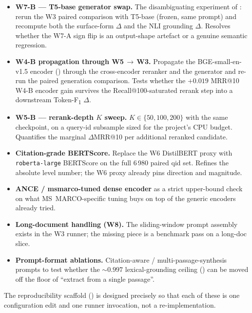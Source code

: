\documentclass[11pt,a4paper]{article}
\makeatletter
\newcommand{\fdev}{6\,980}
\newcommand{\msmarco}{MS~MARCO}
\newcommand{\F}{F\textsubscript{1}}
\newcommand{\Tokenf}{Token-\F}
\newcommand{\bertscore}{BERTScore}
\newcommand{\mrr}{MRR@10}
\newcommand{\recallH}{Recall@100}
\newcommand{\barrow}{\,\allowbreak\ensuremath{\rightarrow}\allowbreak\,}
\makeatother
\begin{document}
\begin{itemize}
  \item \textbf{W7-B --- T5-base generator swap.}  The disambiguating
        experiment of : rerun the W3
        paired comparison with T5-base (frozen, same prompt) and
        recompute both the surface-form $\Delta$ and the NLI
        grounding $\Delta$.  Resolves whether the W7-A sign flip
        is an output-shape artefact or a genuine semantic
        regression.
  \item \textbf{W4-B propagation through W5\barrow{}W3.}  Propagate
        the BGE-small-en-v1.5 encoder ()
        through the cross-encoder reranker and the generator and
        re-run the paired generation comparison.  Tests whether the
        $+0.019$ \mrr{} W4-B encoder gain survives the
        \recallH{}-saturated rerank step into a downstream
        \Tokenf{} $\Delta$.
  \item \textbf{W5-B --- rerank-depth $K$ sweep.}  $K\!\in\!\{50,
        100, 200\}$ with the same checkpoint, on a query-id
        subsample sized for the project's CPU budget.  Quantifies
        the marginal $\Delta$\mrr{} per additional reranked
        candidate.
  \item \textbf{Citation-grade BERTScore.}  Replace the W6
        DistilBERT proxy with \texttt{roberta-large} \bertscore{}
        on the full \fdev{} paired qid set.  Refines the absolute
        level number; the W6 proxy already pins direction and
        magnitude.
  \item \textbf{ANCE / msmarco-tuned dense encoder} as a strict
        upper-bound check on what \msmarco{}-specific tuning buys
        on top of the generic encoders already tried.
  \item \textbf{Long-document handling (W8).}  The sliding-window
        prompt assembly exists in the W3 runner; the missing piece
        is a benchmark pass on a long-doc slice.
  \item \textbf{Prompt-format ablations.}  Citation-aware /
        multi-passage-synthesis prompts to test whether the
        $\sim\!0.997$ lexical-grounding ceiling ()
        can be moved off the floor of ``extract from a single
        passage''.
\end{itemize}

The reproducibility scaffold () is
designed precisely so that each of these is one configuration edit
and one runner invocation, not a re-implementation.
\end{document}
